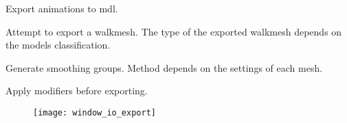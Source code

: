 \begin{description}[leftmargin=12em,style=nextline]
    \item[Export Animations] Export animations to mdl.
    \item[Export Walkmesh] Attempt to export a walkmesh. The type of the exported walkmesh depends on the models classification.
    \item[Export Smooth Groups] Generate smoothing groups. Method depends on the settings of each mesh.
    \item[Apply Modifiers] Apply modifiers before exporting.
\end{description}

\begin{figure}[hb]
    \centering
    \texttt{[image: window\_io\_export]}
\end{figure}
